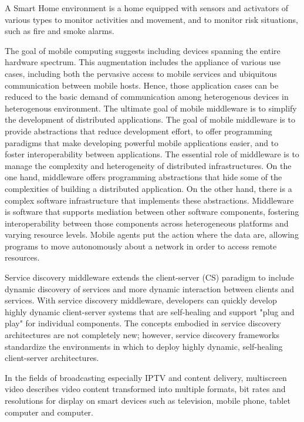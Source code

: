 \documentclass{sig-alternate}
\begin{document}
A Smart Home environment is a home equipped with sensors and activators of various types to monitor activities and movement, and to monitor risk situations, such as fire and smoke alarms. 

The goal of mobile computing suggests including devices spanning the entire hardware spectrum. This augmentation includes the appliance of various use cases,  including both the pervasive access to mobile services and ubiquitous communication between mobile hosts. Hence, those application cases can be reduced to the basic demand of communication among heterogenous devices in heterogenous environment.
The ultimate goal of mobile middleware is to simplify the development of distributed applications.
The goal of mobile middleware is to provide abstractions that reduce development effort, to offer programming paradigms that make developing powerful mobile applications easier, and to foster interoperability between applications.
The essential role of middleware is to manage the complexity and heterogeneity of distributed infrastructures. 
On the one hand, middleware offers programming abstractions that hide some of the complexities of building a distributed application.
On the other hand, there is a complex software infrastructure that implements these abstractions.
Middleware is software that supports mediation between other software components, fostering interoperability between those components across heterogeneous platforms and varying resource levels.
Mobile agents put the action where the data are, allowing programs to move autonomously about a network in order to access remote resources.

Service discovery middleware extends the client-server (CS) paradigm to include dynamic discovery of services and more dynamic interaction between clients and services.
With service discovery middleware, developers can quickly develop highly dynamic client-server systems that are self-healing and support "plug and play" for individual components.
The concepts embodied in service discovery architectures are not completely new; however, service discovery frameworks standardize the environments in which to deploy highly dynamic, self-healing client-server architectures.

In the fields of broadcasting especially IPTV and content delivery, multiscreen video describes video content transformed into multiple formats, bit rates and resolutions for display on smart devices such as television, mobile phone, tablet computer and computer.
\end{document}
